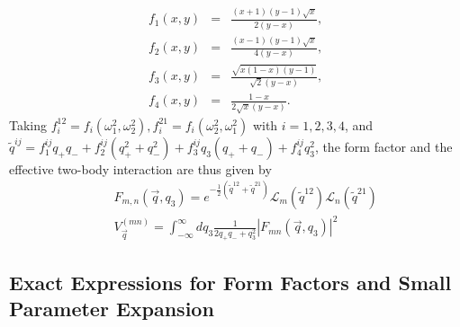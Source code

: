 \documentclass[twocolumn,showpacs,amsmath,amstex,amssymb,mathfonts,prb]{revtex4-1}
\begin{document}
\begin{eqnarray}\label{function}
f_1\left(x,y\right)&=&\frac{\left(x+1\right)\left(y-1\right)\sqrt x}{2\left(y-x\right)},\nonumber\\
f_2\left(x,y\right)&=&\frac{\left(x-1\right)\left(y-1\right)\sqrt x}{4\left(y-x\right)},\nonumber\\
f_3\left(x,y\right)&=&\frac{\sqrt{x\left(1-x\right)\left(y-1\right)}}{\sqrt 2\left(y-x\right)},\nonumber\\
f_4\left(x,y\right)&=&\frac{1-x}{2\sqrt x\left(y-x\right)}.
\end{eqnarray}
Taking $f_i^{12}=f_i\left(\omega_1^2,\omega_2^2\right), f_i^{21}=f_i\left(\omega_2^2,\omega_1^2\right)$ with $i=1,2,3,4$, and $\tilde q^{ij}=f_1^{ij}q_+q_-+f_2^{ij}\left(q_+^2+q_-^{2}\right)+f_3^{ij}q_3\left(q_++q_-\right)+f_4^{ij}q_3^2$, the form factor and the effective two-body interaction are thus given by
\begin{eqnarray}\label{finalf}
&&F_{m,n}\left(\vec q,q_3\right)=e^{-\frac{1}{2}\left(\tilde q^{12}+\tilde q^{21}\right)}\mathcal L_m\left(\tilde q^{12}\right)\mathcal L_n\left(\tilde q^{21}\right)\label{fmn}\\
&&V_{\vec q}^{\left(mn\right)}=\int_{-\infty}^{\infty}dq_3\frac{1}{2q_+q_-+q_3^2}|F_{mn}(\vec q,q_3)|^2\label{effective2d}
\end{eqnarray}

\subsection{Exact Expressions for Form Factors and Small Parameter Expansion}
\end{document}
